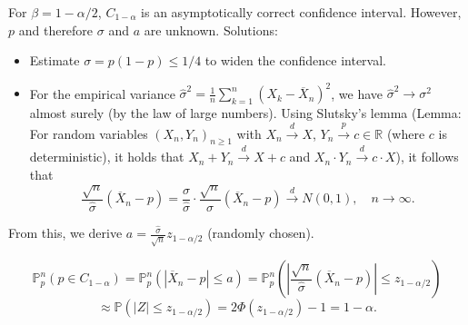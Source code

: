 \documentclass[open=any, 11pt,paper=A4]{scrreprt}
\begin{document}
\begin{example}
For \( \beta = 1 - \alpha/2 \), \( C_{1-\alpha} \) is an asymptotically correct confidence interval. However, \( p \) and therefore \( \sigma \) and \( a \) are unknown. Solutions:

\begin{itemize}
    \item Estimate \( \sigma = p(1 - p) \leq 1/4 \) to widen the confidence interval.
    
    \item For the empirical variance \( \hat{\sigma}^2 = \frac{1}{n} \sum_{k=1}^n (X_k - \overline{X}_n)^2 \), we have \( \hat{\sigma}^2 \to \sigma^2 \) almost surely (by the law of large numbers). Using Slutsky’s lemma (Lemma: For random variables \( (X_n, Y_n)_{n \geq 1} \) with \( X_n \xrightarrow{d} X \), \( Y_n \xrightarrow{p} c \in \mathbb{R} \) (where \( c \) is deterministic), it holds that \( X_n + Y_n \xrightarrow{d} X + c \) and \( X_n \cdot Y_n \xrightarrow{d} c \cdot X \)), it follows that
    \[
    \frac{\sqrt{n}}{\hat{\sigma}} \left( \overline{X}_n - p \right) = \frac{\sigma}{\hat{\sigma}} \cdot \frac{\sqrt{n}}{\sigma} \left( \overline{X}_n - p \right) \xrightarrow{d} N(0,1), \quad n \to \infty.
    \]
\end{itemize}

From this, we derive \( a = \frac{\hat{\sigma}}{\sqrt{n}} z_{1 - \alpha / 2} \) (randomly chosen).

\[
\mathbb{P}_p^n(p \in C_{1 - \alpha}) = \mathbb{P}_p^n \left( |\overline{X}_n - p| \leq a \right) = \mathbb{P}_p^n \left( \left| \frac{\sqrt{n}}{\hat{\sigma}} (\overline{X}_n - p) \right| \leq z_{1 - \alpha / 2} \right)
\]
\[
\approx \mathbb{P}(|Z| \leq z_{1 - \alpha / 2}) = 2 \Phi(z_{1 - \alpha / 2}) - 1 = 1 - \alpha.
\]
\end{example}





















\iffalse


\appendix

\end{document}
